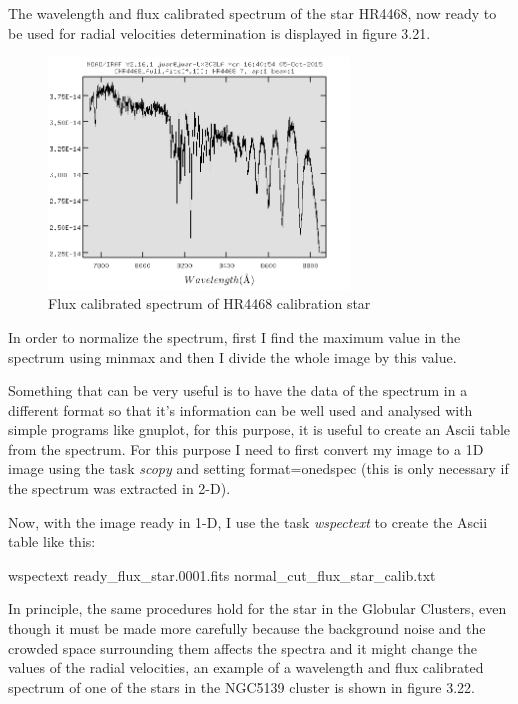 The wavelength and flux calibrated spectrum of the star HR4468, now ready to be used for radial velocities determination is displayed in figure 3.21.

\begin{figure}[H]
\centering
\includegraphics[width=8cm]{images/calib_star_flux.png}
\caption[Flux calibrated spectrum of HR4468]{Flux calibrated spectrum of HR4468 calibration star}
\end{figure}

In order to normalize the spectrum, first I find the maximum value in the spectrum using minmax and then I divide the whole image by this value. 

Something that can be very useful is to have the data of the spectrum in a different format so that it's information can be well used and analysed with simple programs like gnuplot, for this purpose, it is useful to create an Ascii table from the spectrum. For this purpose I need to first convert my image to a 1D image using the task \textit{scopy} and setting format=onedspec (this is only necessary if the spectrum was extracted in 2-D).

Now, with the image ready in 1-D, I use the task \textit{wspectext} to create the Ascii table like this:

\begin{center}
wspectext ready\_flux\_star.0001.fits normal\_cut\_flux\_star\_calib.txt
\end{center}

In principle, the same procedures hold for the star in the Globular Clusters, even though it must be made more carefully because the background noise and the crowded space surrounding them affects the spectra and it might change the values of the radial velocities, an example of a wavelength and flux calibrated spectrum of one of the stars in the NGC5139 cluster is shown in figure 3.22.

